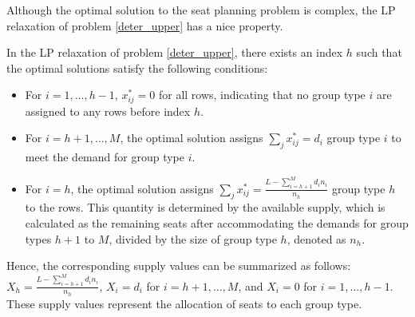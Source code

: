 Although the optimal solution to the seat planning problem is complex, the LP relaxation of problem \eqref{deter_upper} has a nice property.

\begin{prop}\label{sol_relax_deter}
In the LP relaxation of problem \eqref{deter_upper}, there exists an index $h$ such that the optimal solutions satisfy the following conditions:

\begin{itemize}
  \item For $i = 1,\ldots, h-1$, $x_{ij}^{*} = 0$ for all rows, indicating that no group type $i$ are assigned to any rows before index $h$.
  \item For $i = h+1,\ldots, M$, the optimal solution assigns $\sum_{j} x_{ij}^{*} = d_{i}$ group type $i$ to meet the demand for group type $i$.
  \item For $i = h$, the optimal solution assigns $\sum_{j} x_{ij}^{*} = \frac{L - \sum_{i = h+1}^{M} {d_i n_i}}{n_h}$ group type $h$ to the rows. This quantity is determined by the available supply, which is calculated as the remaining seats after accommodating the demands for group types $h+1$ to $M$, divided by the size of group type $h$, denoted as $n_h$.
\end{itemize}

Hence, the corresponding supply values can be summarized as follows: $X_h = \frac{L - \sum_{i = h+1}^{M} {d_i n_i}}{n_h}$, $X_{i} = d_{i}$ for $i = h+1,\ldots, M$, and $X_{i} = 0$ for $i = 1, \ldots, h-1$. These supply values represent the allocation of seats to each group type.
\end{prop}




